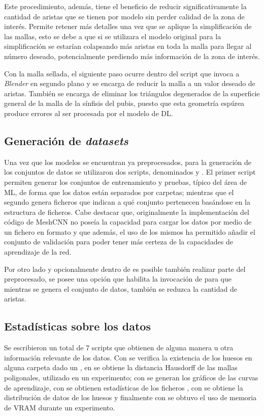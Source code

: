 Este procedimiento, además, tiene el beneficio de reducir significativamente la cantidad de aristas que se tienen por modelo sin perder calidad de la zona de interés. Permite retener más detalles una vez que se aplique la simplificación de las mallas, esto se debe a que si se utilizara el modelo original para la simplificación se estarían colapsando más aristas en toda la malla para llegar al número deseado, potencialmente perdiendo más información de la zona de interés.

Con la malla sellada, el siguiente paso ocurre dentro del script  que invoca a \textit{Blender} en segundo plano y se encarga de reducir la malla a un valor deseado de aristas. También se encarga de eliminar los triángulos degenerados de la superficie general de la malla de la sínfisis del pubis, puesto que esta geometría espúrea produce errores al ser procesada por el modelo de DL.

\subsection{Generación de \textit{datasets}}
\label{section:datasets}
Una vez que los modelos se encuentran ya preprocesados, para la generación de los conjuntos de datos se utilizaron dos scripts, denominados  y . El primer script permiten generar los conjuntos de entrenamiento y pruebas, típico del área de ML, de forma que los datos están separados por carpetas; mientras que el segundo genera ficheros  que indican a qué conjunto pertenecen basándose en la estructura de ficheros. Cabe destacar que, originalmente la implementación del código de MeshCNN no poseía la capacidad para cargar los datos por medio de un fichero en formato  y que además, el uso de los mismos ha permitido añadir el conjunto de validación para poder tener más certeza de la capacidades de aprendizaje de la red.

Por otro lado y opcionalmente dentro de  es posible también realizar parte del preprocesado, se posee una opción que habilita la invocación de  para que mientras se genera el conjunto de datos, también se reduzca la cantidad de aristas.

\subsection{Estadísticas sobre los datos}
Se escribieron un total de 7 scripts que obtienen de alguna manera u otra información relevante de los datos. Con  se verifica la existencia de los huesos en alguna carpeta dado un , en  se obtiene la distancia Hausdorff de las mallas poligonales, utilizado en un experimento; con  se generan los gráficos de las curvas de aprendizaje, con  se obtienen estadísticas de los ficheros , con  se obtiene la distribución de datos de los huesos y finalmente con  se obtuvo el uso de memoria de VRAM durante un experimento.


